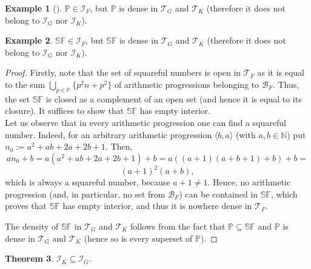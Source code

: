 \documentclass{amsart}
\newtheorem{thm}{Theorem}[section]
\theoremstyle{definition}
\newtheorem{ex}[thm]{Example}
\newcommand{\N}{{\mathbb N}}
\newcommand{\I}{\mathcal I}
\newcommand{\T}{\mathcal{T}}
\newcommand{\B}{\mathcal{B}}
\newcommand{\SqrFr}{\mathbb{SF}}
\newcommand{\arithseq}[2]{\langle#2, #1\rangle}
\begin{document}
\begin{ex}[{\cite[Section 5]{Szczuka4}}] \label{primes}
$\mathbb{P}\in \I_F$, but $\mathbb{P}$ is dense in $\T_G$ and $\T_K$ (therefore it does not belong to $\I_G$ nor $\I_K$).
\end{ex}

\begin{ex} 
$\SqrFr\in \I_F$, but $\SqrFr$ is dense in $\T_G$ and $\T_K$ (therefore it does not belong to $\I_G$ nor $\I_K$).
\end{ex}

\begin{proof}
Firstly, note that the set of squareful numbers is open in $\T_F$ as it is equal to the sum $\bigcup_{p\in\mathbb{P}}{\{p^2 n+p^2\}}$ of arithmetic progressions belonging to $\B_F$. Thus, the set $\SqrFr$ is closed as a complement of an open set (and hence it is equal to its closure). It suffices to show that $\SqrFr$ has empty interior.\\
Let us observe that in every arithmetic progression one can find a squareful number. Indeed, for an arbitrary arithmetic progression $\arithseq{a}{b}$ (with $a,b\in\N$) put $n_0 := a^2 +ab+2a+2b+1$. 
Then,
$$an_0 +b = a(a^2 +ab+2a+2b+1)+b = a((a+1)(a+b+1)+b)+b = $$
$$ (a+1)^2 (a+b),$$
which is always a squareful number, because $a+1  \neq 1$. Hence, no arithmetic progression (and, in particular, no set from $\B_F$) can be contained in $\SqrFr$, which proves that $\SqrFr$ has empty interior, and thus it is nowhere dense in $\T_F$.

The density of $\SqrFr$ in $\T_G$ and $\T_K$ follows from the fact that $\mathbb{P}\subseteq \SqrFr$ and $\mathbb{P}$ is dense in $\T_G$ and $\T_K$ (hence so is every superset of $\mathbb{P}$).
\end{proof}

\begin{thm}
$\I_K \subseteq \I_G$.
\end{thm}
\end{document}
